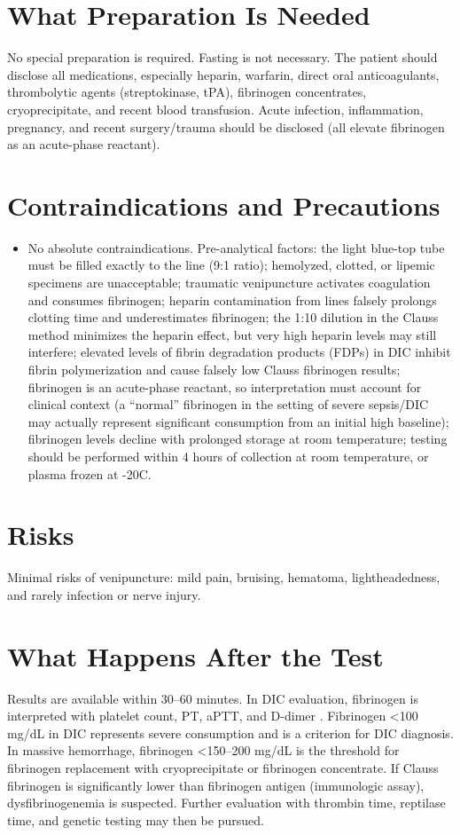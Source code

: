 \section*{What Preparation Is Needed}
No special preparation is required. Fasting is not necessary. The patient should disclose all medications, especially heparin, warfarin, direct oral anticoagulants, thrombolytic agents (streptokinase, tPA), fibrinogen concentrates, cryoprecipitate, and recent blood transfusion. Acute infection, inflammation, pregnancy, and recent surgery/trauma should be disclosed (all elevate fibrinogen as an acute-phase reactant).

\section*{Contraindications and Precautions}
\begin{itemize}
  \item No absolute contraindications. Pre-analytical factors: the light blue-top tube must be filled exactly to the line (9:1 ratio); hemolyzed, clotted, or lipemic specimens are unacceptable; traumatic venipuncture activates coagulation and consumes fibrinogen; heparin contamination from lines falsely prolongs clotting time and underestimates fibrinogen; the 1:10 dilution in the Clauss method minimizes the heparin effect, but very high heparin levels may still interfere; elevated levels of fibrin degradation products (FDPs) in DIC inhibit fibrin polymerization and cause falsely low Clauss fibrinogen results; fibrinogen is an acute-phase reactant, so interpretation must account for clinical context (a ``normal'' fibrinogen in the setting of severe sepsis/DIC may actually represent significant consumption from an initial high baseline); fibrinogen levels decline with prolonged storage at room temperature; testing should be performed within 4 hours of collection at room temperature, or plasma frozen at -20\textdegree{}C.
\end{itemize}
\section*{Risks}
Minimal risks of venipuncture: mild pain, bruising, hematoma, lightheadedness, and rarely infection or nerve injury.

\section*{What Happens After the Test}
Results are available within 30--60 minutes. In DIC evaluation, fibrinogen is interpreted with platelet count, PT, aPTT, and D-dimer \cite{tierney2023current}. Fibrinogen <100 mg/dL in DIC represents severe consumption and is a criterion for DIC diagnosis. In massive hemorrhage, fibrinogen <150--200 mg/dL is the threshold for fibrinogen replacement with cryoprecipitate or fibrinogen concentrate. If Clauss fibrinogen is significantly lower than fibrinogen antigen (immunologic assay), dysfibrinogenemia is suspected. Further evaluation with thrombin time, reptilase time, and genetic testing may then be pursued.

